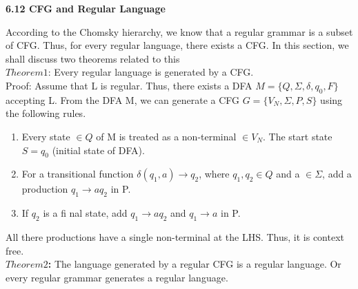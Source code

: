 \documentclass[a4,9pt]{beamer}
\begin{document}
\begin{frame}
\large{
\textbf{6.12 CFG and Regular Language}\\
}

\vspace*{0.2cm}
\small{
According to the Chomsky hierarchy, we know that a regular grammar is a subset of CFG. Thus, for
every regular language, there exists a CFG. In this section, we shall discuss two theorems related to this\\

\vspace*{0.2cm}
\textbf{$Theorem 1$}: Every regular language is generated by a CFG. \\

\vspace*{0.2cm}
Proof: Assume that L is regular. Thus, there exists a DFA $M = \{Q, \Sigma, \delta, q_{0}, F\}$ accepting L. From the
DFA M, we can generate a CFG $G = \{V_{N}, \Sigma, P, S \}$ using the following rules.\\
\vspace*{0.1cm}

\begin{enumerate}
  \item Every state $\in Q$ of M is treated as a non-terminal $\in V_{N}$. The start state $S = q_{0}$ (initial state of
DFA).\\
  \item For a transitional function $\delta(q_{1}, a) \rightarrow q_{2}$, where $q_{1}, q_{2} \in Q$ and a $\in \Sigma$, add a production $q_{1} \rightarrow aq_{2}$ in P.\\
  \item If $q_{2}$ is a fi nal state, add $q_{1}\rightarrow aq_{2}$ and $q_{1} \rightarrow a$ in P.\\
\end{enumerate}

\vspace*{0.1cm}
All there productions have a single non-terminal at the LHS. Thus, it is context free.\\

\vspace*{0.2cm}
\textbf{$Theorem 2$:} The language generated by a regular CFG is a regular language. Or every regular grammar
generates a regular language.\\
}
\end{frame}
\end{document}
